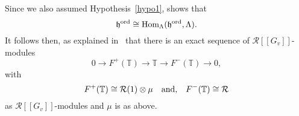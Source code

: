 \documentclass[12pt]{amsart}
\numberwithin{equation}{section}
\begin{document}
  Since we also assumed Hypothesis~\ref{hypo1}, \cite[Th\'eor\`{e}me 7]{mazurtil} shows that 
 $$\frak{h}^{\textup{ord}}\cong \textup{Hom}_{\Lambda}(\frak{h}^{\textup{ord}},{\Lambda}).$$
 It follows then, as explained in~\cite[Proposition 12.7.14.1]{nek} that there is an exact sequence of ${\mathcal{R}}[[G_v]]$-modules
  \begin{equation} \label{seq:TT}0 {\longrightarrow}{F}^+({\mathbb{T}}) {\longrightarrow} {\mathbb{T}} {\longrightarrow}{F}^-({\mathbb{T}})  {\longrightarrow} 0,\end{equation}
  with
  \begin{equation}\label{eqn:grfactors} {F}^+({\mathbb{T}})\cong{\mathcal{R}}(1)\otimes\mu\,\,\,\, \hbox{ and, }\,\,\,\,   {F}^-({\mathbb{T}})\cong{\mathcal{R}} \end{equation}
  as ${\mathcal{R}}[[G_v]]$-modules and $\mu$ is as above.
\end{document}
